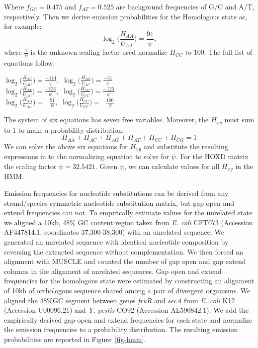 \documentclass{ws-procs975x65}
\begin{document}
Where $f_{GC}=0.475$ and $f_{AT}=0.525$ are background frequencies of G/C and A/T, respectively.
Then we derive emission probabilities for the Homologous state as, for example:
\begin{equation}
\log_{2}\bigg(\frac{H_{AA}}{U_{AA}}\bigg) = \frac{91}{\psi},
\end{equation}
where $\frac{1}{\psi}$ is the unknown scaling factor used normalize $H_{CC}$ to 100. The full list of equations follow:
\begin{center}$\log_{2}\bigg(\frac{H_{AC}}{U_{AC}}\bigg) = \frac{-114}{\psi},$
$\log_{2}\bigg(\frac{H_{AG}}{U_{AC}}\bigg) = \frac{-31}{\psi}$ \\
$\log_{2}\bigg(\frac{H_{AT}}{U_{AC}}\bigg) = \frac{-123}{\psi},$
$\log_{2}\bigg(\frac{H_{CG}}{U_{CC}}\bigg) = \frac{-125}{\psi}$ \\
$\log_{2}\bigg(\frac{H_{AA}}{U_{AA}}\bigg) = \ \ \ \frac{91}{\psi},$
$\log_{2}\bigg(\frac{H_{CC}}{U_{CC}}\bigg) = \ \ \ \frac{100}{\psi}$ \\
\end{center}

The system of six equations has seven free variables.  Moreover, the $H_{xy}$ must sum to 1 to make a probability distribution:
\begin{equation}
H_{AA} + H_{AC} + H_{AG} + H_{AT} + H_{CC} + H_{CG} = 1
\end{equation}
We can solve the above six equations for $H_{xy}$ and substitute the resulting expressions in to the
normalizing equation to solve for $\psi$. For the HOXD matrix the scaling factor $\psi=32.5421$. Given $\psi$, we can calculate values for all $H_{xy}$ in the HMM.

Emission frequencies for nucleotide substitutions can be derived from any strand/species symmetric nucleotide substitution matrix, but gap open and extend frequencies can not.  To empirically estimate values for the unrelated state we aligned a 10kb, 48\% GC content region taken from \emph{E. coli} CFT073 (Accession AF447814.1, coordinates 37,300-38,300) with an unrelated sequence.  We generated an unrelated sequence with identical nucleotide composition by reversing the extracted sequence without complementation.  We then forced an alignment with MUSCLE and counted the number of gap open and gap extend columns in the alignment of unrelated sequences.  Gap open and extend frequencies for the homologous state were estimated by constructing an alignment of 10kb of orthologous sequence shared among a pair of divergent organisms.  We aligned the 48\%GC segment between genes \textit{fruR} and \textit{secA} from \textit{E. coli} K12 (Accession U00096.21) and \emph{Y. pestis} CO92 (Accession AL590842.1). We add the empirically derived gap-open and extend frequencies for each state and normalize the emission frequencies to a probability distribution.  The resulting emission probabilities are reported in Figure~\ref{fig-hmm}.
\end{document}
